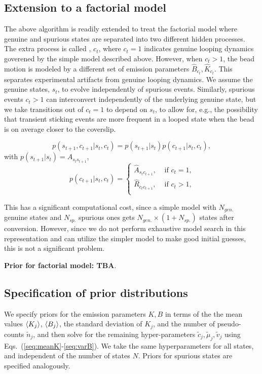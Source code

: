 \subsection{Extension to a factorial model}
The above algorithm is readily extended to treat the factorial model
where genuine and spurious states are separated into two different
hidden processes. The extra process is called , $c_t$, where $c_t=1$
indicates genuine looping dynamics goverened by the simple model
described above. However, when $c_t>1$, the bead motion is modeled by
a different set of emission parameters $\hat B_{c_t},\hat
K_{c_t}$. This separates experimental artifacts from genuine looping
dynamics. We assume the genuine states, $s_t$, to evolve independently
of spurious events. Similarly, spurious events $c_t>1$ can
interconvert independently of the underlying genuine state, but we
take transitions out of $c_t=1$ to depend on $s_t$, to allow for,
e.g., the possibility that transient sticking events are more frequent
in a looped state when the bead is on average closer to the
coverslip. \cite{notfinished}


\begin{equation}
  p(s_{t+1},c_{t+1}|s_t,c_t)=p(s_{t+1}|s_t)p(c_{t+1}|s_t,c_t),
\end{equation}
with $p(s_{t+1}|s_t)=A_{s_ts_{t+1}}$,
\begin{equation}
  p(c_{t+1}|s_t,c_t)
  =\left\{
  \begin{array}{ll}
    \hat A_{s_tc_{t+1}},&\text{ if $c_t=1$,}\\
    \hat R_{c_tc_{t+1}},&\text{ if $c_t>1$,}\\
  \end{array}
  \right.
\end{equation}


This has a significant computational cost, since a simple model with
$N_{gen.}$ genuine states and $N_{sp.}$ spurious ones gets
$N_{gen.}\times(1+N_{sp.})$ states after conversion. However, since we
do not perform exhaustive model search in this representation and can
utilize the simpler model to make good initial guesses, this is not a
significant problem.


{\bf Prior for factorial model: TBA}.\cite{factorialmodelprior}


\subsection{Specification of prior distributions}
We specify priors for the emission parameters $K,B$ in terms of the
the mean values $\left\langle K_j\right\rangle$, $\left\langle B_j\right\rangle$, the standard deviation of
$K_j$, and the number of pseudo-counts $\tilde n_j$, and then solve
for the remaining hyper-parameters $\tilde c_j, \tilde \mu_j,\tilde
v_j$ using Eqs.~(\ref{seq:meanK}-\ref{seq:varB}).  We take the same
hyperparameters for all states, and independent of the number of
states $N$. Priors for spurious states are specified analogously.

